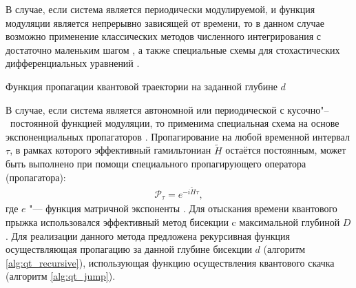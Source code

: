 В случае, если система является периодически модулируемой, и функция модуляции является непрерывно зависящей от времени, то в данном случае возможно применение классических методов численного интегрирования \cite{Lambert1991} с достаточно маленьким шагом \cite{Breuer2007}, а также специальные схемы для стохастических дифференциальных уравнений \cite{Cao2003}.

\IncMargin{1em}
\begin{algorithm}
	\SetAlgoLined
	\caption{Функция пропагации квантовой траектории на заданной глубине \(d\)}
	\label{alg:qt_recursive}
\end{algorithm}
\DecMargin{1em}

В случае, если система является автономной или периодической с кусочно"--~постоянной функцией модуляции, то применима специальная схема на основе экспоненциальных пропагаторов \cite{Volokitin2017}.
Пропагирование на любой временной интервал \(\tau\), в рамках которого эффективный гамильтониан \(\tilde{H}\) остаётся постоянным, может быть выполнено при помощи специального пропагирующего оператора (пропагатора):
\begin{equation}
\label{eq:propagator}
\begin{gathered}
\mathcal{P}_{\tau} = e^{-i \tilde{H} \tau},
\end{gathered}
\end{equation}
где \(e\) "--- функция матричной экспоненты \cite{Moler2003}. Для отыскания времени квантового прыжка использовался эффективный метод бисекции \cite{Knuth1997} c максимальной глубиной \(D\). 
Для реализации данного метода предложена рекурсивная функция осуществляющая пропагацию за данной глубине бисекции \(d\) (алгоритм \ref{alg:qt_recursive}), использующая функцию осуществления квантового скачка (алгоритм \ref{alg:qt_jump}).


